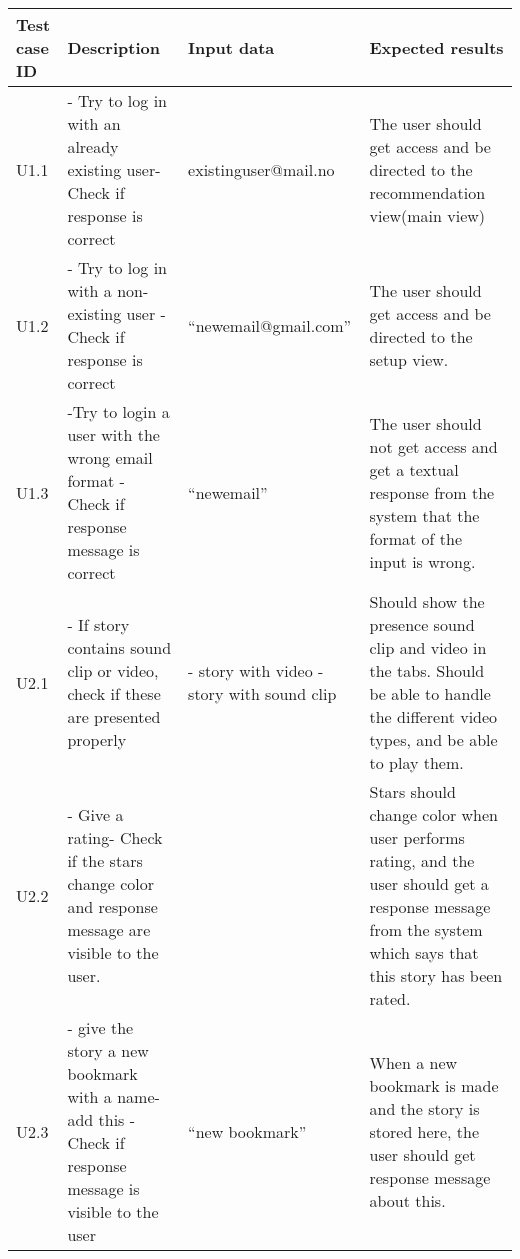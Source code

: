 \begin{table}[!h]
	\centering
	\small
		\begin{tabular}{ | p{1cm} | p{6.5cm} | p{3cm} | p{6.5cm} |}
			\hline
			\textbf{Test case ID} & \textbf{Description} & \textbf{Input data} & \textbf{Expected results} \\ \hline
			
			U1.1 & - Try to log in with an already existing user\newline - Check if response is correct & existinguser@\newline mail.no & The user should get access and be directed to the recommendation view(main view) \\ \hline
			
			U1.2 & - Try to log in with a non-existing user \newline - Check if response is correct & “newemail@\newline gmail.com” & The user should get access and be directed to the setup view. \\ \hline
			
			U1.3 & -Try to login a user with the wrong email format \newline - Check if response message is correct & “newemail” & The user should not get access and get a textual response from the system that the format of the input is wrong.  \\ \hline
			
			U2.1 & - If story contains sound clip or video, check if these are presented properly & - story with video\newline
			-story with sound clip & Should show the presence sound clip and video in the tabs. Should be able to handle the different video types, and be able to play them.  \\ \hline
			
			U2.2 & - Give a rating\newline - Check if the stars change color and response message are visible to the user.  & & Stars should change color when user performs rating, and the user should get a response message from the system which says that this story has been rated.  \\ \hline
			
			U2.3 & - give the story a new bookmark with a name\newline -add this \newline -Check if response message is visible to the user  & “new bookmark”  & When a new bookmark is made and the story is stored here, the user should get response message about this. \\ \hline
			

\end{tabular}
\end{table}
